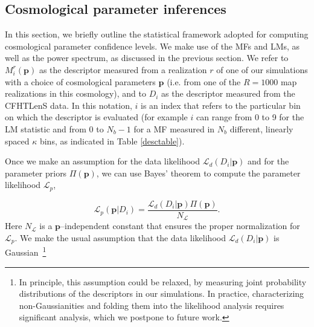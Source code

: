 \documentclass[reprint,aps,prd,superscriptaddress,showkeys,showpacs]{revtex4-1}
\begin{document}
\subsection{Cosmological parameter inferences}
\label{cosmostats}

In this section, we briefly outline the statistical framework
adopted for computing cosmological parameter confidence levels.  We
make use of the MFs and LMs, as well as the power spectrum, as
discussed in the previous section. We refer to $M_i^r(\mathbf{p})$ as
the descriptor measured from a realization $r$ of one of our
simulations with a choice of cosmological parameters $\mathbf{p}$
(i.e. from one of the $R=1000$ map realizations in this cosmology), and to $D_i$
as the descriptor measured from the CFHTLenS data.
In this notation, $i$ is an index that refers to the particular bin on
which the descriptor is evaluated (for example $i$ can range from 0 to
9 for the LM statistic and from 0 to $N_b-1$ for a MF measured in
$N_b$ different, linearly spaced $\kappa$ bins, as indicated in Table \ref{desctable}).


Once we make an assumption for the data likelihood
$\mathcal{L}_d(D_i\vert \mathbf{p})$ and for the parameter priors
$\Pi(\mathbf{p})$, we can use Bayes' theorem to compute the parameter
likelihood $\mathcal{L}_p$,

\begin{equation}
\label{parameterlikelihood}
\mathcal{L}_p(\mathbf{p}\vert D_i) = \frac{\mathcal{L}_d(D_i\vert \mathbf{p})\Pi(\mathbf{p})}{N_{\mathcal{L}}}.
\end{equation}
Here $N_{\mathcal{L}}$ is a $\mathbf{p}$--independent constant that
ensures the proper normalization for $\mathcal{L}_p$. We make the
usual assumption that the data likelihood $\mathcal{L}_d(D_i\vert
\mathbf{p})$ is Gaussian~\footnote{In principle, this assumption could
  be relaxed, by measuring joint probability distributions of the
  descriptors in our simulations.  In practice, characterizing
  non-Gaussianities and folding them into the likelihood analysis
  requires significant analysis, which we postpone to future work.}
\end{document}
